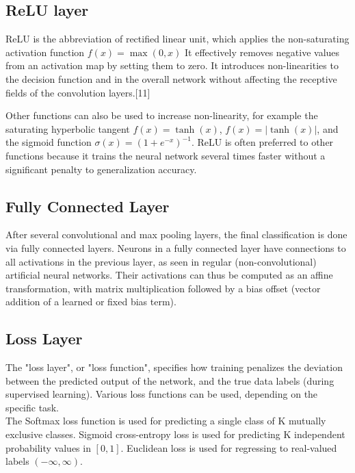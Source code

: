\documentclass[12pt,a4paper]{article}
\begin{document}
\subsection{ReLU layer}
ReLU is the abbreviation of rectified linear unit, which applies the non-saturating activation function $\textstyle f(x)=\max(0,x)$ It effectively removes negative values from an activation map by setting them to zero. It introduces non-linearities to the decision function and in the overall network without affecting the receptive fields of the convolution layers.[11]

Other functions can also be used to increase non-linearity, for example the saturating hyperbolic tangent $\displaystyle f(x)=\tanh(x)$, $\displaystyle f(x)=|\tanh(x)|$, and the sigmoid function $\textstyle \sigma (x)=(1+e^{-x})^{-1}$. ReLU is often preferred to other functions because it trains the neural network several times faster without a significant penalty to generalization accuracy.
\subsection{Fully Connected Layer}
After several convolutional and max pooling layers, the final classification is done via fully connected layers. Neurons in a fully connected layer have connections to all activations in the previous layer, as seen in regular (non-convolutional) artificial neural networks. Their activations can thus be computed as an affine transformation, with matrix multiplication followed by a bias offset (vector addition of a learned or fixed bias term).
\subsection{Loss Layer}
The "loss layer", or "loss function", specifies how training penalizes the deviation between the predicted output of the network, and the true data labels (during supervised learning). Various loss functions can be used, depending on the specific task.
\\
The Softmax loss function is used for predicting a single class of K mutually exclusive classes. Sigmoid cross-entropy loss is used for predicting K independent probability values in $\displaystyle [0,1]$. Euclidean loss is used for regressing to real-valued labels $\displaystyle (-\infty ,\infty )$. 
\end{document}
